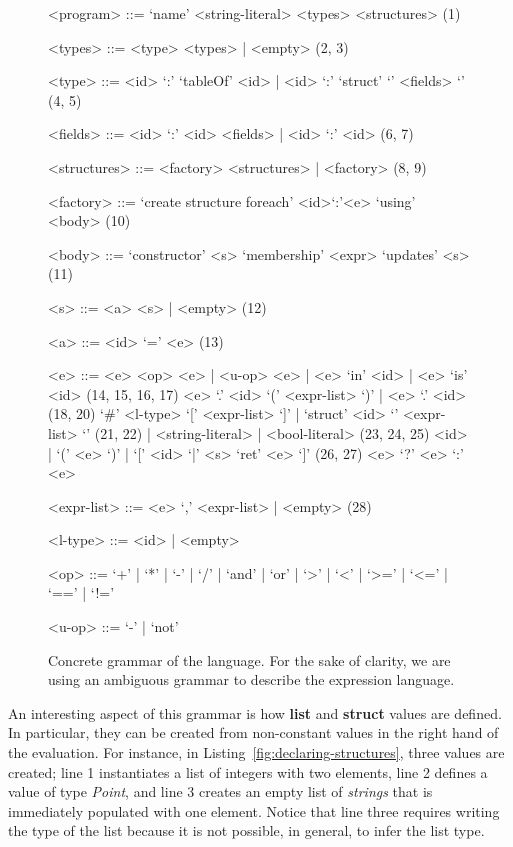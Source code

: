 {
\scriptsize
\begin{figure}[!ht]
\begin{mdframed}[outermargin=0.2cm, innermargin=0.5cm]

\newcommand{\grule}[1]{\hfill{\scriptsize (#1)}}
\setlength{\grammarindent}{4em}
\begin{grammar}

<program> ::=  `name' <string-literal> <types> <structures> \grule{1}

<types> ::= <type> <types> | <empty> \grule{2, 3}

<type> ::= <id> `:' `tableOf' <id> | <id> `:' `struct' `{' <fields> `}' \grule{4, 5}

<fields> ::= <id> `:' <id> <fields> | <id> `:' <id> \grule{6, 7}

<structures> ::= <factory> <structures> | <factory> \grule{8, 9}

<factory> ::= `create structure foreach' <id>`:'<e> `using' <body> \grule{10}

<body> ::= `constructor' <s> `membership' <expr> `updates' <s> \grule{11}

<s> ::= <a> <s> | <empty> \grule{12}

<a> ::= <id> `=' <e>  \grule{13} 

<e> ::= <e> <op> <e> | <u-op> <e> | <e> `in' <id> | <e> `is' <id> \grule{14, 15, 16, 17}
\alt <e> `.' <id> `(' <expr-list> `)' | <e> `.' <id> \grule{18, 20}
\alt `#' <l-type> `[' <expr-list> `]' | `struct' <id> `{' <expr-list> `}' \grule{21, 22}
 | <string-literal> | <bool-literal> \grule{23, 24, 25}
\alt <id> | `(' <e> `)' | `[' <id> `|' <s> `ret' <e> `]' \grule{26, 27}
\alt <e> `?' <e> `:' <e>

<expr-list> ::= <e> `,' <expr-list> | <empty>  \grule{28}

<l-type> ::= <id> | <empty>

<op> ::= `+' | `*' | `-' | `/' | `and' | `or' | `>' | `<' | `>=' | `<=' | `==' | `!='

<u-op> ::= `-' | `not'

\end{grammar}
\end{mdframed}
\caption{Concrete grammar of the language. For the sake of clarity, we are using an ambiguous grammar to describe the expression language.} \label{fig:dsl-grammar}
\end{figure}
}


An interesting aspect of this grammar is how \textbf{list} and \textbf{struct} values are defined.
In particular, they can be created from non-constant values in the right hand of the evaluation.
For instance, in Listing~\ref{fig:declaring-structures}, three values are created; line 1 instantiates a list of integers with two elements, line 2 defines a value of type \textit{Point}, and line 3 creates an empty list of \textit{strings} that is immediately populated with one element.
Notice that line three requires writing the type of the list because it is not possible, in general, to infer the list type. 

